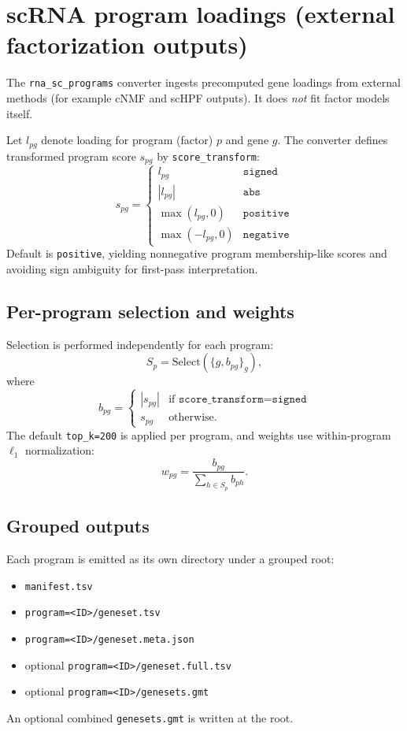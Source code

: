 \documentclass[11pt]{article}
\begin{document}
\section{scRNA program loadings (external factorization outputs)}
The \texttt{rna\_sc\_programs} converter ingests precomputed gene loadings from external methods (for example cNMF and scHPF outputs). It does \emph{not} fit factor models itself.

Let $l_{pg}$ denote loading for program (factor) $p$ and gene $g$. The converter defines transformed program score $s_{pg}$ by \texttt{score\_transform}:
\[
s_{pg} =
\begin{cases}
l_{pg} & \texttt{signed}\\
|l_{pg}| & \texttt{abs}\\
\max(l_{pg}, 0) & \texttt{positive}\\
\max(-l_{pg}, 0) & \texttt{negative}
\end{cases}
\]
Default is \texttt{positive}, yielding nonnegative program membership-like scores and avoiding sign ambiguity for first-pass interpretation.

\subsection*{Per-program selection and weights}
Selection is performed independently for each program:
\[
S_p = \mathrm{Select}\left(\{g, b_{pg}\}_g\right),
\]
where
\[
b_{pg} =
\begin{cases}
|s_{pg}| & \text{if } \texttt{score\_transform=signed}\\
s_{pg} & \text{otherwise}.
\end{cases}
\]
The default \texttt{top\_k=200} is applied per program, and weights use within-program $\ell_1$ normalization:
\[
w_{pg} = \frac{b_{pg}}{\sum_{h \in S_p} b_{ph}}.
\]

\subsection*{Grouped outputs}
Each program is emitted as its own directory under a grouped root:
\begin{itemize}[leftmargin=2em]
\item \texttt{manifest.tsv}
\item \texttt{program=<ID>/geneset.tsv}
\item \texttt{program=<ID>/geneset.meta.json}
\item optional \texttt{program=<ID>/geneset.full.tsv}
\item optional \texttt{program=<ID>/genesets.gmt}
\end{itemize}
An optional combined \texttt{genesets.gmt} is written at the root.
\end{document}

